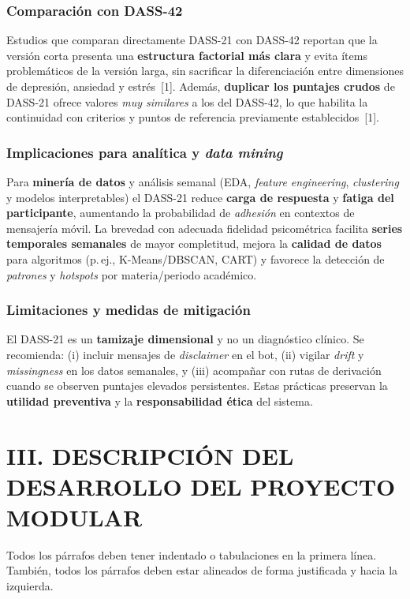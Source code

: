 ﻿\documentclass[10pt,twocolumn]{article}
\begin{document}
\subsubsection*{Comparación con DASS{-}42}
Estudios que comparan directamente DASS{-}21 con DASS{-}42 reportan que la versión corta presenta una \textbf{estructura factorial más clara} y evita ítems problemáticos de la versión larga, sin sacrificar la diferenciación entre dimensiones de depresión, ansiedad y estrés~[1]. Además, \textbf{duplicar los puntajes crudos} de DASS{-}21 ofrece valores \emph{muy similares} a los del DASS{-}42, lo que habilita la continuidad con criterios y puntos de referencia previamente establecidos~[1].

\subsubsection*{Implicaciones para analítica y \emph{data mining}}
Para \textbf{minería de datos} y análisis semanal (EDA, \emph{feature engineering}, \emph{clustering} y modelos interpretables) el DASS{-}21 reduce \textbf{carga de respuesta} y \textbf{fatiga del participante}, aumentando la probabilidad de \emph{adhesión} en contextos de mensajería móvil. La brevedad con adecuada fidelidad psicométrica facilita \textbf{series temporales semanales} de mayor completitud, mejora la \textbf{calidad de datos} para algoritmos (p.\,ej., K{-}Means/DBSCAN, CART) y favorece la detección de \emph{patrones} y \emph{hotspots} por materia/periodo académico.

\subsubsection*{Limitaciones y medidas de mitigación}
El DASS{-}21 es un \textbf{tamizaje dimensional} y no un diagnóstico clínico. Se recomienda: (i) incluir mensajes de \emph{disclaimer} en el bot, (ii) vigilar \emph{drift} y \emph{missingness} en los datos semanales, y (iii) acompañar con rutas de derivación cuando se observen puntajes elevados persistentes. Estas prácticas preservan la \textbf{utilidad preventiva} y la \textbf{responsabilidad ética} del sistema.

\section*{III. DESCRIPCIÓN DEL DESARROLLO DEL PROYECTO MODULAR}
Todos los párrafos deben tener indentado o tabulaciones en la primera línea. También, todos los párrafos deben estar alineados de forma justificada y hacia la izquierda.
\end{document}
